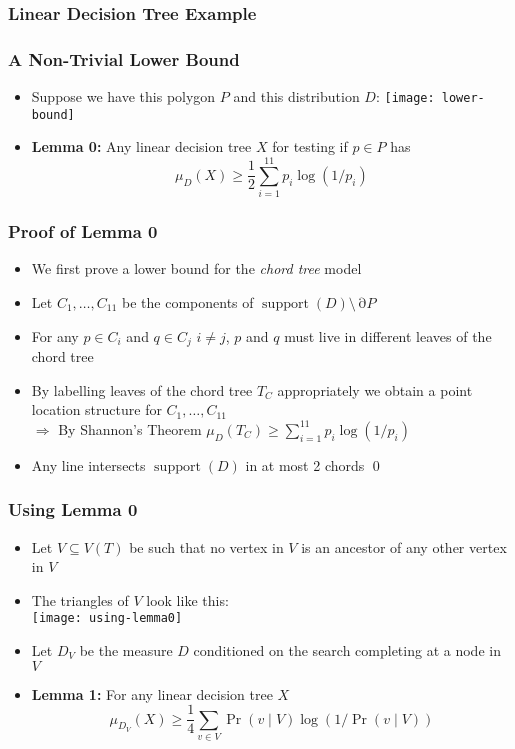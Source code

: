 \documentclass{beamer}
\DeclareMathOperator{\support}{support}
\DeclareMathOperator{\boundary}{\partial}
\begin{document}
\frame
{
	\frametitle{Linear Decision Tree Example}
        \only<5>{\texttt{[image: ld-e]}}%
}


\frame
{
	\frametitle{A Non-Trivial Lower Bound}
        \begin{itemize}
          \item<1-> Suppose we have this polygon $P$ and this distribution $D$:
            \texttt{[image: lower-bound]}
          \item<2-> \textbf{Lemma 0:} Any linear decision tree $X$ for
testing if $p\in P$ has 
\[  \mu_D(X)\ge \frac{1}{2}\sum_{i=1}^{11} p_i\log(1/p_i)  \]
        \end{itemize} 
}


\frame
{
	\frametitle{Proof of Lemma 0}
        \begin{itemize}
           \item<1->We first prove a lower bound for the \emph{chord tree} model\\
           \item<2->Let $C_1,\ldots,C_{11}$ be the components of 
               $\support(D)\setminus \boundary P$

           \item<3->For any $p\in C_i$ and $q\in C_j$ $i\neq j$, $p$ and $q$
               must live in different leaves of the chord tree

           \item<4->By labelling leaves of the chord tree $T_C$
		appropriately we obtain a
               point location structure for $C_1,\ldots,C_{11}$ \\
           $\Rightarrow$ By Shannon's Theorem $\mu_D(T_C) \ge \sum_{i=1}^{11}p_i\log (1/p_i)$
           \item<5->Any line intersects $\support(D)$ in at most 2 chords
		\hfill{\qed}
        \end{itemize}
}


\frame
{
    \frametitle{Using Lemma 0}
    \begin{itemize}
	\item<1-> Let $V\subseteq V(T)$ be such that no vertex in
$V$ is an ancestor of any other vertex in $V$
        \item<2-> The triangles of $V$ look like this:\\
	\texttt{[image: using-lemma0]}
        \item<3->Let $D_V$ be the measure $D$ conditioned on the
search completing at a node in $V$
        \item<4->\textbf{Lemma 1:} For any linear decision tree $X$
        \[ \mu_{D_V}(X) \ge \frac{1}{4}\sum_{v\in V} \Pr(v\mid V)\log (1/\Pr(v\mid V))
         \]
    \end{itemize}
}
\end{document}
